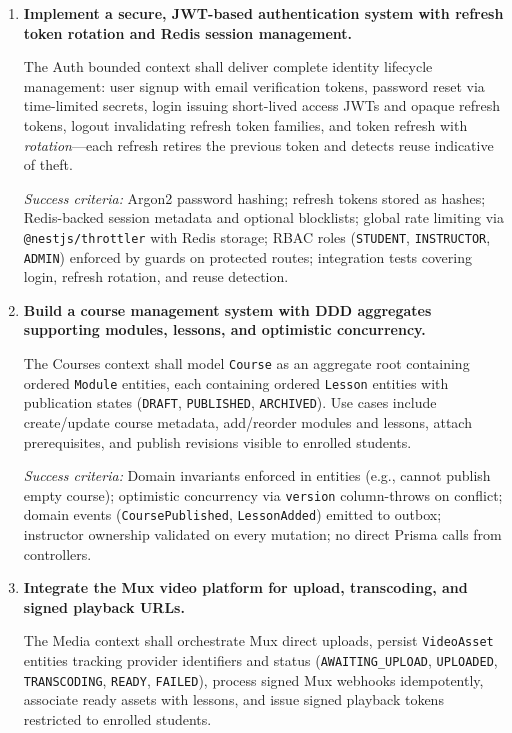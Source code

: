 \begin{enumerate}
  \item \textbf{Implement a secure, JWT-based authentication system with refresh token rotation and Redis session management.}

  The Auth bounded context shall deliver complete identity lifecycle management: user signup with email verification tokens, password reset via time-limited secrets, login issuing short-lived access JWTs and opaque refresh tokens, logout invalidating refresh token families, and token refresh with \textit{rotation}---each refresh retires the previous token and detects reuse indicative of theft.

  \textit{Success criteria:} Argon2 password hashing; refresh tokens stored as hashes; Redis-backed session metadata and optional blocklists; global rate limiting via \texttt{@nestjs/throttler} with Redis storage; RBAC roles (\texttt{STUDENT}, \texttt{INSTRUCTOR}, \texttt{ADMIN}) enforced by guards on protected routes; integration tests covering login, refresh rotation, and reuse detection.

  \item \textbf{Build a course management system with DDD aggregates supporting modules, lessons, and optimistic concurrency.}

  The Courses context shall model \texttt{Course} as an aggregate root containing ordered \texttt{Module} entities, each containing ordered \texttt{Lesson} entities with publication states (\texttt{DRAFT}, \texttt{PUBLISHED}, \texttt{ARCHIVED}). Use cases include create/update course metadata, add/reorder modules and lessons, attach prerequisites, and publish revisions visible to enrolled students.

  \textit{Success criteria:} Domain invariants enforced in entities (e.g., cannot publish empty course); optimistic concurrency via \texttt{version} column-throws on conflict; domain events (\texttt{CoursePublished}, \texttt{LessonAdded}) emitted to outbox; instructor ownership validated on every mutation; no direct Prisma calls from controllers.

  \item \textbf{Integrate the Mux video platform for upload, transcoding, and signed playback URLs.}

  The Media context shall orchestrate Mux direct uploads, persist \texttt{VideoAsset} entities tracking provider identifiers and status (\texttt{AWAITING\_UPLOAD}, \texttt{UPLOADED}, \texttt{TRANSCODING}, \texttt{READY}, \texttt{FAILED}), process signed Mux webhooks idempotently, associate ready assets with lessons, and issue signed playback tokens restricted to enrolled students.


\end{enumerate}
